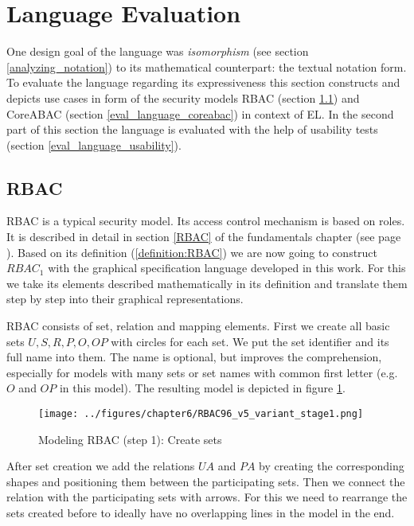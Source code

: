 \documentclass[twoside, openright, 12pt]{book}
\begin{document}
\section{Language Evaluation}
\label{eval_language}
One design goal of the language was \textit{isomorphism} (see section \ref{analyzing_notation}) to its mathematical counterpart: the textual notation form.
To evaluate the language regarding its expressiveness this section constructs and depicts use cases in form of the security models RBAC (section \ref{eval_language_rbac}) and CoreABAC (section \ref{eval_language_coreabac}) in context of EL.
In the second part of this section the language is evaluated with the help of usability tests (section \ref{eval_language_usability}).



\subsection{RBAC}
\label{eval_language_rbac}
RBAC is a typical security model.
Its access control mechanism is based on roles.
It is described in detail in section \ref{RBAC} of the fundamentals chapter (see page \pageref{RBAC}).
Based on its definition (\ref{definition:RBAC}) we are now going to construct $RBAC_1$ with the graphical specification language developed in this work.
For this we take its elements described mathematically in its definition and translate them step by step into their graphical representations.

RBAC consists of set, relation and mapping elements.
First we create all basic sets $U, S, R, P, O, OP$ with circles for each set.
We put the set identifier and its full name into them.
The name is optional, but improves the comprehension, especially for models with many sets or set names with common first letter (e.g.\ $O$ and $OP$ in this model).
The resulting model is depicted in figure \ref{fig:RBAC96_v5_variant_stage1}.

\begin{figure}[htb]
	\centering
	\texttt{[image: ../figures/chapter6/RBAC96\_v5\_variant\_stage1.png]}
	\caption{Modeling RBAC (step 1): Create sets}
	\label{fig:RBAC96_v5_variant_stage1}
\end{figure}

\noindent
After set creation we add the relations $UA$ and $PA$ by creating the corresponding shapes and positioning them between the participating sets.
Then we connect the relation with the participating sets with arrows.
For this we need to rearrange the sets created before to ideally have no overlapping lines in the model in the end.
\end{document}
